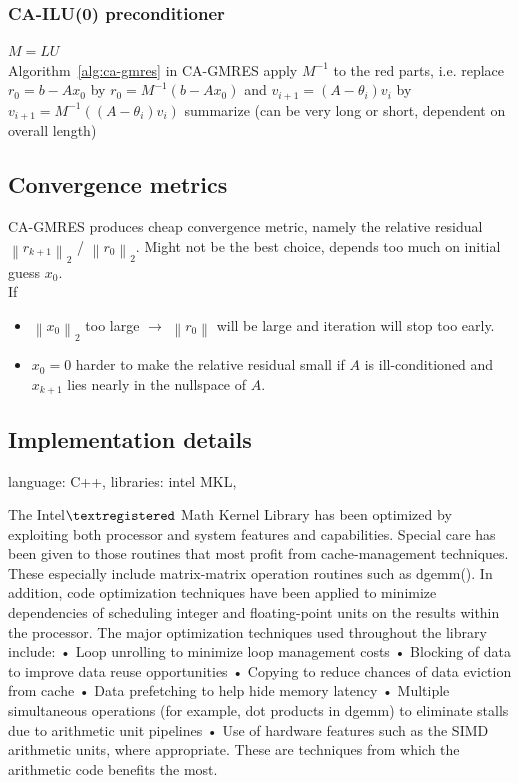 \documentclass{scrartcl}
\numberwithin{equation}{section}
\newcommand{\norm}[1]{\left\lVert#1\right\rVert}
\begin{document}
\subsubsection{CA-ILU(0) preconditioner} \label{sec:ca-ilu}
$M = LU$ \\
Algorithm~\ref{alg:ca-gmres} in CA-GMRES apply $M^{-1}$ to the red parts, i.e. replace $r_0 = b - Ax_0$ by $r_0 = M^{-1}(b - Ax_0)$ and  $v_{i + 1} = (A - \theta_i)v_i$ by $v_{i + 1} = M^{-1}((A - \theta_i)v_i)$
summarize \cite{Grigori} (can be very long or short, dependent on overall length)
\subsection{Convergence metrics}
CA-GMRES produces cheap convergence metric, namely the relative residual $\norm{r_{k+1}}_2$ / $\norm{r_0}_2$. Might not be the best choice, depends too much on initial guess $x_0$.\\

If 
\begin{itemize}
\item $\norm{x_0}_2$ too large $\rightarrow$ $\norm{r_0}$ will be large and iteration will stop too early.
\item $x_0 = 0$ harder to make the relative residual small if $A$ is ill-conditioned and $x_{k+1}$ lies nearly in the nullspace of $A$.
\end{itemize}
\subsection{Implementation details}
language: C++, libraries: intel MKL,

The Intel$\textregistered$ Math Kernel Library has been optimized by exploiting both processor and system features and
capabilities. Special care has been given to those routines that most profit from cache-management
techniques. These especially include matrix-matrix operation routines such as dgemm().
In addition, code optimization techniques have been applied to minimize dependencies of scheduling integer
and floating-point units on the results within the processor.
The major optimization techniques used throughout the library include:
• Loop unrolling to minimize loop management costs
• Blocking of data to improve data reuse opportunities
• Copying to reduce chances of data eviction from cache
• Data prefetching to help hide memory latency
• Multiple simultaneous operations (for example, dot products in dgemm) to eliminate stalls due to arithmetic unit pipelines
• Use of hardware features such as the SIMD arithmetic units, where appropriate.
These are techniques from which the arithmetic code benefits the most.
\end{document}
